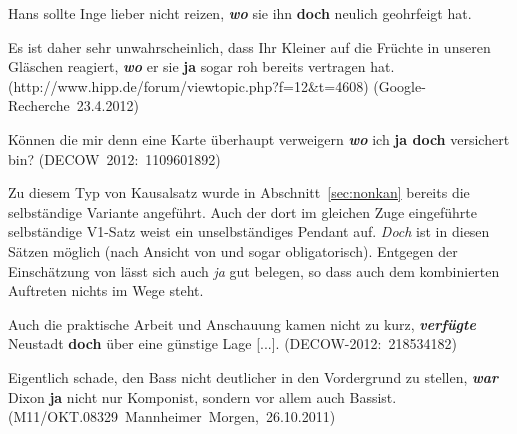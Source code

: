 \begin{exe}
	\ex\label{370} 
	Hans sollte Inge lieber nicht reizen, \textbf{\textit{wo}} sie ihn \textbf{doch} neulich geohrfeigt hat.	
	\hfill\hbox {\citet[77]{Borst1985}}
\end{exe}	

\begin{exe}
	\ex\label{371} 
	\scriptsize
	Es ist daher sehr unwahrscheinlich, dass Ihr Kleiner auf die Früchte in unseren Gläschen reagiert, \textit{\textbf{wo}} er sie \textbf{ja} sogar roh 		bereits vertragen hat.	
	\hfill\hbox {(http://www.hipp.de/forum/viewtopic.php?f=12\&t=4608)}
	\newline
	\hbox{}\hfill\hbox {(Google-Recherche 23.4.2012)}
\end{exe}

\begin{exe}
	\ex\label{372} 
	Können die mir denn eine Karte überhaupt verweigern \textbf{\textit{wo}} ich \textbf{ja doch} versichert bin?
	\hfill\hbox {(DECOW 2012: 1109601892)}
\end{exe}
Zu diesem Typ von Kausalsatz wurde in Abschnitt~\ref{sec:nonkan} bereits die selbständige Variante angeführt. Auch der dort im gleichen Zuge eingeführte selbständige V1-Satz weist ein unselbständiges Pendant auf. \textit{Doch} ist in diesen Sätzen möglich (nach Ansicht von \citealt[77-80]{Borst1985} und \citealt[13]{Rinas2006} sogar obligatorisch). Entgegen der Einschätzung von \citet[213]{Rinas2006} lässt sich auch \textit{ja} gut belegen, so dass auch dem kombinierten Auftreten nichts im Wege steht.
	
\begin{exe}
	\ex\label{373} 
	\scriptsize
	Auch die praktische Arbeit und Anschauung kamen nicht zu kurz, \textbf{\textit{verfügte}} Neustadt \textbf{doch} über eine günstige Lage [...].	
	\hfill\hbox {(DECOW-2012: 218534182)}
\end{exe}	
	
\begin{exe}
	\ex\label{374} 
	\scriptsize
	Eigentlich schade, den Bass nicht deutlicher in den Vordergrund zu stellen, \textbf{\textit{war}} Dixon \textbf{ja} nicht nur Komponist, sondern vor 		allem auch Bassist. 
	\hfill\hbox {(M11/OKT.08329 Mannheimer Morgen, 26.10.2011)}
\end{exe}

